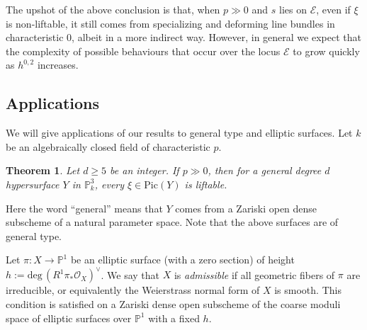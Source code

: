 \documentclass[letter, 11pt]{article}
\theoremstyle{plain}
\newtheorem{theorem}[subsubsection]{Theorem}
\theoremstyle{definition}
\newcommand{\IP}{\mathbb{P}}
\newcommand{\<}{\langle}
\renewcommand{\>}{\rangle}
\newcommand{\sE}{\mathcal{E}}
\newcommand{\sO}{\mathcal{O}}
\newcommand{\Pic}{\mathrm{Pic}}
\begin{document}
The upshot of the above conclusion is that, when $p \gg 0$ and $s$ lies on $\sE$, even if $\xi$ is non-liftable, it still comes from specializing and deforming line bundles in characteristic $0$, albeit in a more indirect way. However, in general we expect that the complexity of possible behaviours that occur over the locus $\sE$ to grow quickly as $h^{0, 2}$ increases. 





\subsection{Applications} We will give applications of our results to general type and elliptic surfaces. Let $k$ be an algebraically closed field of characteristic $p$. 


\begin{theorem}
\label{thm: surfaces in P3 intro}
    Let $d \ge 5$ be an integer. If $p \gg 0$, then for a general degree $d$ hypersurface $Y$ in $\IP^3_k$, every $\xi \in \Pic(Y)$ is liftable. 
\end{theorem}
\noindent Here the word ``general'' means that $Y$ comes from a Zariski open dense subscheme of a natural parameter space. Note that the above surfaces are of general type. 



Let $\pi : X \to \IP^1$ be an elliptic surface (with a zero section) of height $h := \mathrm{deg\,}(R^1 \pi_* \sO_X)^\vee$. We say that $X$ is \textit{admissible} if all geometric fibers of $\pi$ are irreducible, or equivalently the Weierstrass normal form of $X$ is smooth. This condition is satisfied on a Zariski dense open subscheme of the coarse moduli space of elliptic surfaces over $\IP^1$ with a fixed $h$. 

\end{document}
